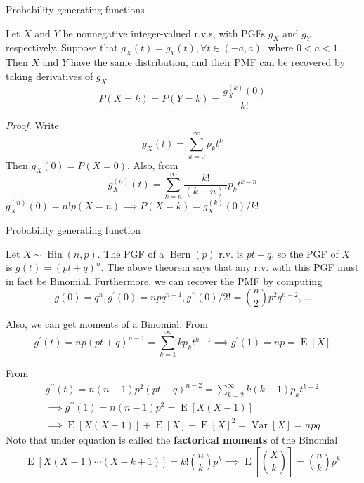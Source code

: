\documentclass[8pt]{beamer}
\newcommand{\tb}[1]{\textbf{#1}}
\newcommand{\ti}[1]{\textit{#1}}
\newcommand{\myber}[1]{\operatorname{Bern}\!\left(#1\right)}
\newcommand{\mybin}[2]{\operatorname{Bin}\!\left(#1,#2\right)}
\newcommand{\expec}[1]{\operatorname{E}\left[ #1 \right]}
\newcommand{\myvar}[1]{\operatorname{Var}\left[#1\right]}
\begin{document}
\begin{frame}{Probability generating functions}
    \begin{theorem}
        Let $X$ and $Y$ be nonnegative integer-valued r.v.s, with PGFs $g_X$ and $g_Y$ respectively. Suppose that $g_X(t) = g_Y(t), \forall t \in (-a, a)$, where $0<a<1$. Then $X$ and $Y$ have the same distribution, and their PMF can be recovered by taking derivatives of $g_X$
        \[
        P(X=k) = P(Y=k) = \frac{g_X^{(k)} (0)}{k!}
        \]
    \end{theorem}

    \ti{Proof.} Write
    \[
    g_X(t) = \sum_{k=0}^\infty p_k t^k
    \]
    Then $g_X(0) = P(X=0)$. Also, from 
    \[
        g^{(n)}_X(t) = \sum_{k=n}^\infty \frac{k!}{(k-n)!} p_k t^{k-n}
    \]
    $g^{(n)}_X(0) = n! p(X=n) \implies P(X=k) = g^{(k)}_X(0)/k!$
\end{frame}

\begin{frame}{Probability generating function}
    \begin{example}
        Let $X \sim \mybin{n}{p}$. The PGF of a $\myber{p}$ r.v. is $pt + q$, so the PGF of $X$ is $g(t) = (pt + q)^n$. The above theorem says that any r.v. with this PGF must in fact be Binomial. Furthermore, we can recover the PMF by computing
        \[
        g(0) = q^n, g^\prime (0) = npq^{n-1}, g^{\prime \prime} (0) / 2! = \binom{n}{2} p^2 q^{n-2}, \dots
        \]

        Also, we can get moments of a Binomial. From
        \[
            g^\prime (t) = np (pt + q)^{n-1} = \sum_{k=1}^\infty kp_k t^{k-1} \implies g^\prime (1) = np = \expec{X}
        \]

        From 
        \[
        \begin{gathered}
            g^{\prime \prime} (t) = n(n-1) p^2 (pt+q)^{n-2} = \sum_{k=2}^\infty k(k-1) p_k t^{k-2}\\
            \implies g^{\prime \prime}(1) = n(n-1) p^2 = \expec{X(X-1)} \\
            \implies \expec{X(X-1)} + \expec{X}  - \expec{X}^2= \myvar{X}  = npq
        \end{gathered}
        \] Note that under equation is called the \tb{factorical moments} of the Binomial 
        \[\expec{X(X-1)\cdots (X-k+1)} = k! \binom{n}{k}p^k \implies \expec{\binom{X}{k}} = \binom{n}{k} p^k\]
    \end{example}
\end{frame}
\end{document}
